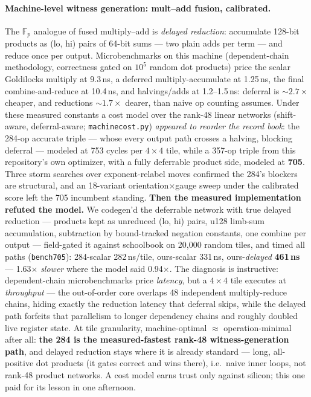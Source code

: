 \documentclass[10pt]{article}
\begin{document}
\paragraph{Machine-level witness generation: mult--add fusion,
calibrated.} The $\mathbb{F}_p$ analogue of fused multiply--add is
\emph{delayed reduction}: accumulate 128-bit products as (lo, hi)
pairs of 64-bit sums --- two plain adds per term --- and reduce
once per output. Microbenchmarks on this machine (dependent-chain
methodology, correctness gated on $10^5$ random dot products)
price the scalar Goldilocks multiply at 9.3\,ns, a deferred
multiply-accumulate at 1.25\,ns, the final combine-and-reduce at
10.4\,ns, and halvings/adds at 1.2--1.5\,ns: deferral is
${\sim}2.7\times$ cheaper, and reductions ${\sim}1.7\times$
dearer, than naive op counting assumes. Under these measured
constants a cost model over the rank-48 linear networks
(shift-aware, deferral-aware; \texttt{machinecost.py})
\emph{appeared to reorder the record book}: the 284-op accurate
triple --- whose every output path crosses a halving, blocking
deferral --- modeled at 753 cycles per $4{\times}4$ tile, while a
357-op triple from this repository's own optimizer, with a fully
deferrable product side, modeled at \textbf{705}. Three storm
searches over exponent-relabel moves confirmed the 284's blockers
are structural, and an 18-variant orientation$\times$gauge sweep
under the calibrated score left the 705 incumbent standing.
\textbf{Then the measured implementation refuted the model.} We
codegen'd the deferrable network with true delayed reduction ---
products kept as unreduced (lo, hi) pairs, u128 limb-sum
accumulation, subtraction by bound-tracked negation constants, one
combine per output --- field-gated it against schoolbook on 20{,}000
random tiles, and timed all paths (\texttt{bench705}): 284-scalar
282\,ns/tile, ours-scalar 331\,ns, ours-\emph{delayed}
\textbf{461\,ns} --- 1.63$\times$ \emph{slower} where the model said
0.94$\times$. The diagnosis is instructive: dependent-chain
microbenchmarks price \emph{latency}, but a $4{\times}4$ tile
executes at \emph{throughput} --- the out-of-order core overlaps 48
independent multiply-reduce chains, hiding exactly the reduction
latency that deferral skips, while the delayed path forfeits that
parallelism to longer dependency chains and roughly doubled live
register state. At tile granularity, machine-optimal
${\approx}$ operation-minimal after all: \textbf{the 284 is the
measured-fastest rank-48 witness-generation path}, and delayed
reduction stays where it is already standard --- long, all-positive
dot products (it gates correct and wins there), i.e.\ naive inner
loops, not rank-48 product networks. A cost model earns trust only
against silicon; this one paid for its lesson in one afternoon.
\end{document}
